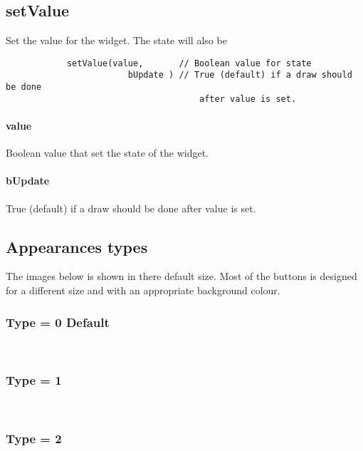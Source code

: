 \documentclass{article}
\begin{document}
        \subsection*{setValue}
        Set the value for the widget. The state will also be 
        \begin{verbatim}
            setValue(value,       // Boolean value for state
                        bUpdate ) // True (default) if a draw should be done
                                      after value is set.
        \end{verbatim}
        \paragraph*{value}
        Boolean value that set the state of the widget.
        \paragraph*{bUpdate}
        True (default) if a draw should be done after value is set.
        
        
        \subsection*{Appearances types}
        The images below is shown in there default size. Most of the buttons 
        is designed for a different size and with an appropriate background colour. 
        
            \subsubsection*{Type = 0 Default}    
            
            \\
        
        
        
            \subsubsection*{Type = 1}    
            
            \\
        
        
        
            \subsubsection*{Type = 2}    
            
\end{document}
